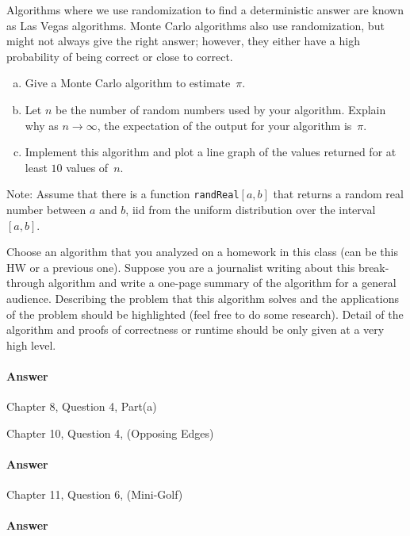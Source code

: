 \documentclass{article}
\begin{document}



\collab{\todo{}}
\nextprob{}

Algorithms where we use randomization to find a deterministic answer are known
as Las Vegas algorithms.  Monte Carlo algorithms also use randomization, but
might not always give the right answer; however, they either have a high
probability of being correct or close to correct.

\begin{enumerate}[(a)]
    \item Give a Monte Carlo algorithm to estimate~$\pi$.
    \item Let $n$ be the number of random numbers used by your algorithm.
        Explain why as $n \to \infty$, the expectation of the output for your
        algorithm is~$\pi$.
    \item Implement this algorithm and plot a line graph of
        the values returned for at least $10$ values of~$n$.
\end{enumerate}

Note: Assume that there is a function \texttt{randReal}$[a,b]$ that returns a random
real number between $a$ and $b$, iid from the uniform distribution over the
interval $[a,b]$.



\collab{\todo{}}
\nextprob{}

Choose an algorithm that you analyzed on a homework in this class (can be this
HW or a previous one).  Suppose you are a journalist writing about this
break-through algorithm and write a one-page summary of the algorithm for a
general audience.  Describing the problem that this algorithm solves and the
applications of the problem should be highlighted (feel free to do some
research).  Detail of the algorithm and proofs of correctness or runtime should
be only given at a very high level.

\paragraph{Answer}



\collab{\todo{}}

Chapter 8, Question 4, Part(a)


\collab{\todo{}}
\nextprob{}

Chapter 10, Question 4, (Opposing Edges)

\paragraph{Answer}

\collab{\todo{}}
\nextprob{}

Chapter 11, Question 6, (Mini-Golf)

\paragraph{Answer}
\end{document}
